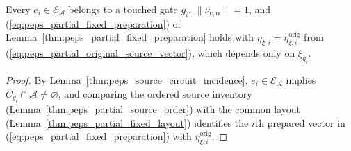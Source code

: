 \begin{lemma}
    \label{thm:peps_partial_original_source_vector}
    \leanok
    Every $e_i\in\mathcal E_{\mathcal A}$ belongs to a touched gate $g_i$, $\|\nu_{e,\alpha}\|=1$, and (\ref{eq:peps_partial_fixed_preparation}) of Lemma~\ref{thm:peps_partial_fixed_preparation} holds with $\eta_{\xi,i}=\eta^{\mathrm{orig}}_{\xi,i}$ from (\ref{eq:peps_partial_original_source_vector}), which depends only on $\xi_{g_i}$.
\end{lemma}
\begin{proof}
    \leanok
    By Lemma~\ref{thm:peps_source_circuit_incidence}, $e_i\in\mathcal E_{\mathcal A}$ implies $C_{g_i}\cap\mathcal A\ne\varnothing$, and comparing the ordered source inventory (Lemma~\ref{thm:peps_partial_source_order}) with the common layout (Lemma~\ref{thm:peps_partial_fixed_layout}) identifies the $i$th prepared vector in (\ref{eq:peps_partial_fixed_preparation}) with $\eta^{\mathrm{orig}}_{\xi,i}$.
\end{proof}

